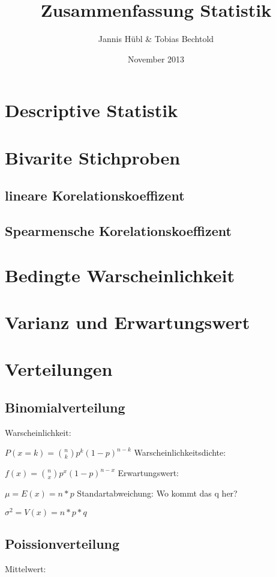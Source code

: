 \documentclass[a4paper, 11pt]{article}
\author{Jannis Hübl & Tobias Bechtold}
\title{Zusammenfassung Statistik}
\date{November 2013}
\begin{document}
\maketitle
\newpage
\tableofcontents

\section{Descriptive Statistik}
\section{Bivarite Stichproben}
\subsection{lineare Korelationskoeffizent}
\subsection{Spearmensche Korelationskoeffizent}
\section{Bedingte Warscheinlichkeit}
\section{Varianz und Erwartungswert}
\section{Verteilungen}
\subsection{Binomialverteilung}
Warscheinlichkeit:

\newline $P(x=k) = \binom{n}{k} p^k (1-p)^{n-k}$
\newline\newline Warscheinlichkeitsdichte:

$f(x) = \binom{n}{x} p^x(1-p)^{n-x}$
\newline\newline Erwartungswert:

$\mu = E(x) = n * p$
\newline\newline Standartabweichung:
Wo kommt das q her?

$\sigma^2 = V(x)= n * p * q$
\subsection{Poissionverteilung}
Mittelwert:
\end{document}

